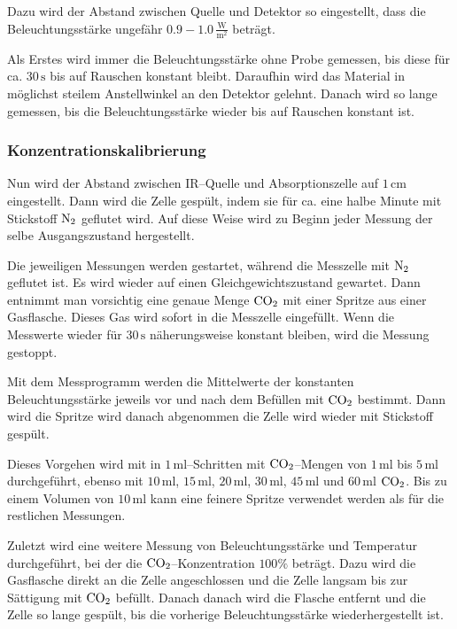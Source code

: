 \documentclass[12pt,a4paper]{scrartcl}
\numberwithin{equation}{section} %
\begin{document}
Dazu wird der Abstand zwischen Quelle und Detektor so eingestellt, dass die Beleuchtungsstärke ungefähr $0.9-1.0\mathrm{\,\frac{W}{m^2}}$ beträgt.

Als Erstes wird immer die Beleuchtungsstärke ohne Probe gemessen, bis diese für ca. $30\mathrm{\,s}$ bis auf Rauschen konstant bleibt. Daraufhin wird das Material in möglichst steilem Anstellwinkel an den Detektor gelehnt. Danach wird so lange gemessen, bis die Beleuchtungsstärke wieder bis auf Rauschen konstant ist.

\subsubsection{Konzentrationskalibrierung}
\label{howto:Konzentrationskalibrierung}
Nun wird der Abstand zwischen IR--Quelle und Absorptionszelle auf $1\mathrm{\,cm}$ eingestellt. Dann wird die Zelle gespült, indem sie für ca. eine halbe Minute mit Stickstoff $\ce{N_2}$ geflutet wird. Auf diese Weise wird zu Beginn jeder Messung der selbe Ausgangszustand hergestellt.

Die jeweiligen Messungen werden gestartet, während die Messzelle mit $\ce{N_2}$ geflutet ist. Es wird wieder auf einen Gleichgewichtszustand gewartet. Dann entnimmt man vorsichtig eine genaue Menge $\ce{CO_2}$ mit einer Spritze aus einer Gasflasche. Dieses Gas wird sofort in die Messzelle eingefüllt. Wenn die Messwerte wieder für $30\mathrm{\,s}$ näherungsweise konstant bleiben, wird die Messung gestoppt.

Mit dem Messprogramm werden die Mittelwerte der konstanten Beleuchtungsstärke jeweils vor und nach dem Befüllen mit $\ce{CO_2}$ bestimmt. Dann wird die Spritze wird danach abgenommen die Zelle wird wieder mit Stickstoff gespült.

Dieses Vorgehen wird mit in $1\mathrm{\,ml}$--Schritten mit $\ce{CO_2}$--Mengen von $1\mathrm{\,ml}$ bis $5\mathrm{\,ml}$ durchgeführt, ebenso mit $10\mathrm{\,ml}$, $15\mathrm{\,ml}$, $20\mathrm{\,ml}$, $30\mathrm{\,ml}$, $45\mathrm{\,ml}$ und $60\mathrm{\,ml}$ $\ce{CO_2}$. Bis zu einem Volumen von $10\mathrm{\,ml}$ kann eine feinere Spritze verwendet werden als für die restlichen Messungen.

Zuletzt wird eine weitere Messung von Beleuchtungsstärke und Temperatur durchgeführt, bei der die $\ce{CO_2}$--Konzentration $100\%$ beträgt. Dazu wird die  Gasflasche direkt an die Zelle angeschlossen und die Zelle langsam bis zur Sättigung mit $\ce{CO_2}$ befüllt. Danach danach wird die Flasche entfernt und die Zelle so lange gespült, bis die vorherige Beleuchtungsstärke wiederhergestellt ist.
\end{document}
